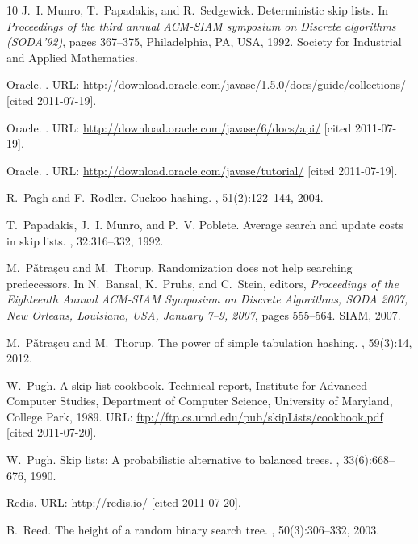 \documentclass[10pt]{book}
\theoremstyle{plain}
\theoremstyle{definition}
\begin{document}
\begin{thebibliography}{10}
J.~I. Munro, T.~Papadakis, and R.~Sedgewick.
\newblock Deterministic skip lists.
\newblock In {\em Proceedings of the third annual ACM-SIAM symposium on
  Discrete algorithms (SODA'92)}, pages 367--375, Philadelphia, PA, USA, 1992.
  Society for Industrial and Applied Mathematics.

Oracle.
.
\newblock URL:
  \url{http://download.oracle.com/javase/1.5.0/docs/guide/collections/} [cited
  2011-07-19].

Oracle.
.
\newblock URL: \url{http://download.oracle.com/javase/6/docs/api/} [cited
  2011-07-19].

Oracle.
.
\newblock URL: \url{http://download.oracle.com/javase/tutorial/} [cited
  2011-07-19].

R.~Pagh and F.~Rodler.
\newblock Cuckoo hashing.
, 51(2):122--144, 2004.

T.~Papadakis, J.~I. Munro, and P.~V. Poblete.
\newblock Average search and update costs in skip lists.
, 32:316--332, 1992.

M.~P{\v a}tra{\c s}cu and M.~Thorup.
\newblock Randomization does not help searching predecessors.
\newblock In N.~Bansal, K.~Pruhs, and C.~Stein, editors, {\em Proceedings of
  the Eighteenth Annual ACM-SIAM Symposium on Discrete Algorithms, SODA 2007,
  New Orleans, Louisiana, USA, January 7--9, 2007}, pages 555--564. SIAM, 2007.

M.~P{\v a}tra{\c s}cu and M.~Thorup.
\newblock The power of simple tabulation hashing.
, 59(3):14, 2012.

W.~Pugh.
\newblock A skip list cookbook.
\newblock Technical report, Institute for Advanced Computer Studies, Department
  of Computer Science, University of Maryland, College Park, 1989.
\newblock URL: \url{ftp://ftp.cs.umd.edu/pub/skipLists/cookbook.pdf} [cited
  2011-07-20].

W.~Pugh.
\newblock Skip lists: A probabilistic alternative to balanced trees.
, 33(6):668--676, 1990.

Redis.
\newblock URL: \url{http://redis.io/} [cited 2011-07-20].

B.~Reed.
\newblock The height of a random binary search tree.
, 50(3):306--332, 2003.


\end{thebibliography}
\end{document}

